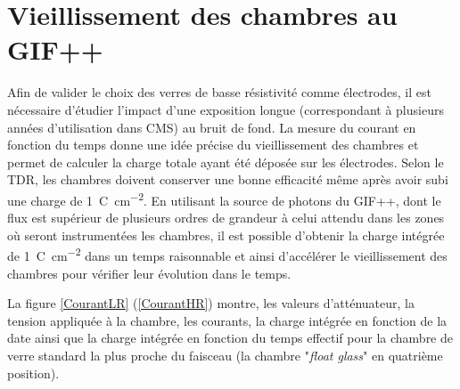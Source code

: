 \section{Vieillissement des chambres au GIF++}
\label{VIEE}
\vspace*{-0.4cm}
Afin de valider le choix des verres de basse résistivité comme électrodes, il est nécessaire d'étudier l'impact d'une exposition longue (correspondant à plusieurs années d'utilisation dans CMS) au bruit de fond. La mesure du courant en fonction du temps donne une idée précise du vieillissement des chambres et permet de calculer la charge totale ayant été déposée sur les électrodes. Selon le TDR, les chambres doivent conserver une bonne efficacité même après avoir subi une charge de \SI{1}{\coulomb\per\square\centi\meter}. En utilisant la source de photons du GIF++, dont le flux est supérieur de plusieurs ordres de grandeur à celui attendu dans les zones où seront instrumentées les chambres, il est possible d'obtenir la charge intégrée de \SI{1}{\coulomb\per\square\centi\meter} dans un temps raisonnable et ainsi d'accélérer le vieillissement des chambres pour vérifier leur évolution dans le temps.

La figure \ref{CourantLR} (\ref{CourantHR}) montre, les valeurs d'atténuateur, la tension appliquée à la chambre, les courants, la charge intégrée en fonction de la date ainsi que la charge intégrée en fonction du temps effectif pour la chambre de verre standard la plus proche du faisceau (la chambre "\textit{float glass}" en quatrième position). 

